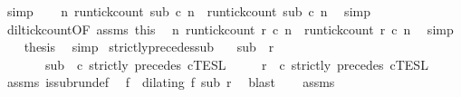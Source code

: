 \begin{isabellebody}
\ simp\isanewline
\ \ \isamarkupfalse%
\ {\isacartoucheopen}{\isasymforall}n{\isachardot}\ {\isacharparenleft}run{\isacharunderscore}tick{\isacharunderscore}count\ sub\ c\ n{\isacharparenright}\ {\isasymle}\ {\isacharparenleft}run{\isacharunderscore}tick{\isacharunderscore}count\ sub\ c\ n{\isacharparenright}{\isacartoucheclose}\ \isamarkupfalse%
\ simp\isanewline
\ \ \isamarkupfalse%
\ dil{\isacharunderscore}tick{\isacharunderscore}count{\isacharbrackleft}OF\ assms{\isacharparenleft}{}{\isacharparenright}\ this{\isacharbrackright}\ \isamarkupfalse%
\ {\isacartoucheopen}{\isasymforall}n{\isachardot}\ {\isacharparenleft}run{\isacharunderscore}tick{\isacharunderscore}count\ r\ c\ n{\isacharparenright}\ {\isasymle}\ {\isacharparenleft}run{\isacharunderscore}tick{\isacharunderscore}count\ r\ c\ n{\isacharparenright}{\isacartoucheclose}\ \isamarkupfalse%
\ simp\isanewline
\ \ \isamarkupfalse%
\ {\isacharquery}thesis\ \isamarkupfalse%
\ simp\isanewline
{}\isamarkupfalse%
%
\endisatagproof
{\isafoldproof}%
%
\isadelimproof
\isanewline
%
\endisadelimproof
\isanewline
{}\isamarkupfalse%
\ strictly{\isacharunderscore}precedes{\isacharunderscore}sub{\isacharcolon}\isanewline
\ \ \ {\isacartoucheopen}sub\ {\isasymlless}\ r{\isacartoucheclose}\isanewline
\ \ \ \ \ \ \ {\isacartoucheopen}sub\ {\isasymin}\ {\isasymlbrakk}c\ strictly\ precedes\ c\isactrlsub T\isactrlsub E\isactrlsub S\isactrlsub L{\isacartoucheclose}\isanewline
\ \ \ \ \ {\isacartoucheopen}r\ {\isasymin}\ {\isasymlbrakk}c\ strictly\ precedes\ c\isactrlsub T\isactrlsub E\isactrlsub S\isactrlsub L{\isacartoucheclose}\isanewline
%
\isadelimproof
%
\endisadelimproof
%
\isatagproof
{}\isamarkupfalse%
\ {\isacharminus}\isanewline
\ \ \isamarkupfalse%
\ assms{\isacharparenleft}{}{\isacharparenright}\ is{\isacharunderscore}subrun{\isacharunderscore}def\ \isamarkupfalse%
\ f\ \ {\isacharasterisk}{\isacharcolon}{\isacartoucheopen}dilating\ f\ sub\ r{\isacartoucheclose}\ \isamarkupfalse%
\ blast\isanewline
\ \ \isamarkupfalse%
\ assms{\isacharparenleft}{}{\isacharparenright}\ \isamarkupfalse%

\end{isabellebody}

